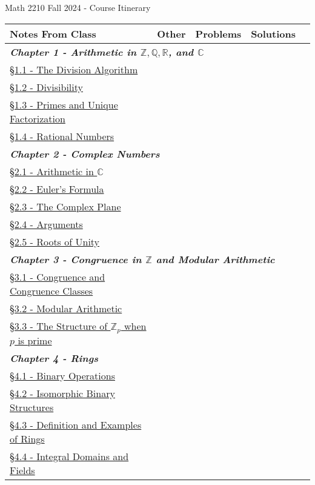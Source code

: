 \documentclass{article}
\newcommand{\chaptercolor}{RoyalBlue!35}
\begin{document}
\large
\begin{center}
{\Huge Math 2210 Fall 2024 - Course Itinerary}
\vspace{0.25cm}

\begin{tabular}{|l|l|l|l|l|}
\cellcolor{black!85}\color{white}Notes From Class & \cellcolor{black!85}\color{white}Other & \cellcolor{black!85}\color{white}Problems & \cellcolor{black!85}\color{white}Solutions\\
%
\hline
%
\multicolumn{4}{|l|}{\cellcolor{\chaptercolor} \textit{\textbf{Chapter 1 - Arithmetic in $\mathbb{Z}, \mathbb{Q}, \mathbb{R}$, and $\mathbb{C}$}}}\\
\hline
\href{}{\S1.1 - The Division Algorithm} & & & \\
\href{}{\S1.2 - Divisibility} & & & \\
\href{}{\S1.3 - Primes and Unique Factorization} & & & \\
\href{}{\S1.4 - Rational Numbers} & & & \\
\hline
\multicolumn{4}{|l|}{\cellcolor{\chaptercolor} \textit{\textbf{Chapter 2 - Complex Numbers}}}\\
\hline
\href{}{\S2.1 - Arithmetic in $\mathbb{C}$} & & & \\
\href{}{\S2.2 - Euler's Formula} & & & \\
\href{}{\S2.3 - The Complex Plane} & & & \\
\href{}{\S2.4 - Arguments} & & & \\
\href{}{\S2.5 - Roots of Unity} & & & \\
\hline
\multicolumn{4}{|l|}{\cellcolor{\chaptercolor} \textit{\textbf{Chapter 3 - Congruence in $\mathbb{Z}$ and Modular Arithmetic}}}\\
\hline
\href{}{\S3.1 - Congruence and Congruence Classes} & & & \\
\href{}{\S3.2 - Modular Arithmetic} & & & \\
\href{}{\S3.3 - The Structure of $\mathbb{Z}_{p}$ when $p$ is prime} & & & \\
\hline
\multicolumn{4}{|l|}{\cellcolor{\chaptercolor} \textit{\textbf{Chapter 4 - Rings}}}\\
\hline
\href{}{\S4.1 - Binary Operations} & & & \\
\href{}{\S4.2 - Isomorphic Binary Structures} & & & \\
\href{}{\S4.3 - Definition and Examples of Rings} & & & \\
\href{}{\S4.4 - Integral Domains and Fields} & & & \\

\end{tabular}
\end{center}
\end{document}
